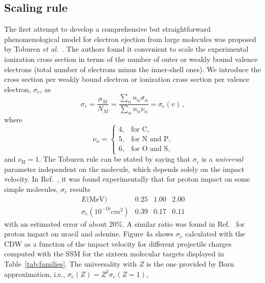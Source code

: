 \documentclass[preprint,12pt]{article}
\begin{document}
\subsection{Scaling rule}

The first attempt to develop a comprehensive but straightforward 
phenomenological model for electron ejection from large molecules was 
proposed by Toburen {\it et al.}~\cite{toburen1975,toburen1976}. 
The authors found it convenient to scale the experimental ionization 
cross section in terms of the number of outer or weakly bound valence 
electrons (total number of electrons minus the inner-shell ones). 
We introduce the cross section per weakly bound electron or ionization 
cross section per valence electron, $\sigma_{e}$, as
\begin{equation}
\sigma_{e}=\frac{\sigma_{M}}{N_{M}}=\frac{\sum\limits_{\alpha}
n_{\alpha}\sigma_{\alpha}}{\sum\limits_{\alpha}n_{\alpha}\nu_{\alpha}}
=\sigma_{e}(v)\,, 
\label{27} 
\end{equation}
where
\begin{equation}
\nu_{\alpha}=\left\{ 
\begin{array}{ll}
4, & \text{for C,} \\ 
5, & \text{for N and P,} \\ 
6, & \text{for O and S,}
\end{array}\right.
\label{eq:nelec} 
\end{equation}
and $\nu_{\text{H}}=1$. The Toburen rule can be stated by saying that 
$\sigma_{e}$ is a \textit{universal} parameter independent on the 
molecule, which depends solely on the impact velocity. 
In Ref.~\cite{toburen1976}, it was found experimentally that for proton 
impact on some simple molecules, $\sigma_{e}$ results
\begin{equation}
\begin{array}{cccc}
E\text{(MeV)}               & 0.25 & 1.00 & 2.00 \\ 
\sigma_{e} (10^{-16}cm^{2}) & 0.39 & 0.17 & 0.11
\end{array}
\label{30}
\end{equation}
with an estimated error of about 20\%. A similar ratio was found in 
Ref.~\cite{itoh2013} for proton impact on uracil and adenine. 
Figure 4a shows $\sigma_{e}$ calculated with the CDW as a function of 
the impact velocity for different projectile charges computed with the 
SSM for the sixteen molecular targets displayed in 
Table~\ref{tab:families}. The universality with $Z$ is the one provided 
by Born approximation, i.e., $\sigma _{e}(Z)=Z^{2}\sigma_{e}(Z=1)$, 
\end{document}
